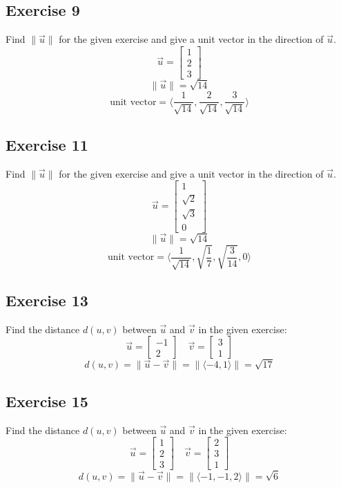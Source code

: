 \documentclass[letterpaper, 12pt]{math}
\begin{document}
\subsection*{Exercise 9}
Find \( \|\vec{u}\| \) for the given exercise and give a unit vector in the
direction of \( \vec{u} \).
\[ \vec{u} = \begin{bmatrix}1 \\ 2 \\ 3\end{bmatrix} \]
\[ \|\vec{u}\| = \sqrt{14} \]
\[ \text{unit vector} =
  \langle\frac{1}{\sqrt{14}},\frac{2}{\sqrt{14}},\frac{3}{\sqrt{14}}\rangle \]

\subsection*{Exercise 11}
Find \( \|\vec{u}\| \) for the given exercise and give a unit vector in the
direction of \( \vec{u} \).
\[ \vec{u} = \begin{bmatrix}1 \\ \sqrt{2} \\ \sqrt{3} \\ 0\end{bmatrix} \]
\[ \|\vec{u}\| = \sqrt{14} \]
\[ \text{unit vector} =
  \langle\frac{1}{\sqrt{14}},\sqrt{\frac{1}{7}},\sqrt{\frac{3}{14}},0\rangle \]

\subsection*{Exercise 13}
Find the distance \( d(u,v) \) between \( \vec{u} \) and \( \vec{v} \) in the
given exercise:
\[ \vec{u} = \begin{bmatrix}-1 \\ 2\end{bmatrix} \quad
  \vec{v} = \begin{bmatrix}3 \\ 1\end{bmatrix} \]
\[ d(u,v) = \|\vec{u}-\vec{v}\| = \|\langle-4,1\rangle\| = \sqrt{17} \]

\subsection*{Exercise 15}
Find the distance \( d(u,v) \) between \( \vec{u} \) and \( \vec{v} \) in the
given exercise:
\[ \vec{u} = \begin{bmatrix}1 \\ 2 \\ 3\end{bmatrix} \quad
  \vec{v} = \begin{bmatrix}2 \\ 3 \\ 1\end{bmatrix} \]
\[ d(u,v) = \|\vec{u}-\vec{v}\| = \|\langle-1,-1,2\rangle\| = \sqrt{6} \]
\end{document}
